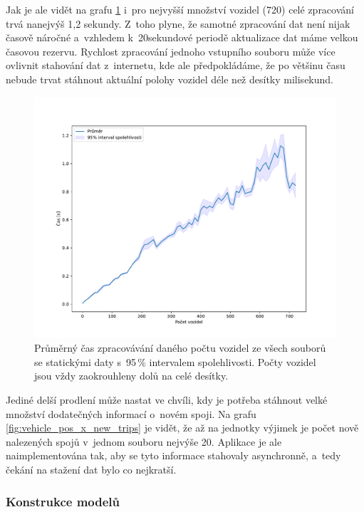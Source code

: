 \bigbreak

Jak je ale vidět na grafu \ref{fig:file_process_time} i~pro nejvyšší množství vozidel (720) celé zpracování trvá nanejvýš 1,2 sekundy. Z~toho plyne, že samotné zpracování dat není nijak časově náročné a~vzhledem k~20sekundové periodě aktualizace dat máme velkou časovou rezervu. Rychlost zpracování jednoho vstupního souboru může více ovlivnit stahování dat z~internetu, kde ale předpokládáme, že po většinu času nebude trvat stáhnout aktuální polohy vozidel déle než desítky milisekund.

\begin{figure}
   \centering
 \includegraphics[width=\linewidth]{../img/file_process_time}
 \caption{Průměrný čas zpracovávání daného počtu vozidel ze všech souborů se statickými daty s~95\,\% intervalem spolehlivosti. Počty vozidel jsou vždy zaokrouhleny dolů na celé desítky.}
 \label{fig:file_process_time}
\end{figure}


\bigbreak

Jediné delší prodlení může nastat ve chvíli, kdy je potřeba stáhnout velké množství dodatečných informací o~novém spoji. Na grafu \ref{fig:vehicle_pos_x_new_trips} je vidět, že až na jednotky výjimek je počet nově nalezených spojů v~jednom souboru nejvýše 20. Aplikace je ale naimplementována tak, aby se tyto informace stahovaly asynchronně, a~tedy čekání na stažení dat bylo co nejkratší.


\subsubsection{Konstrukce modelů}

